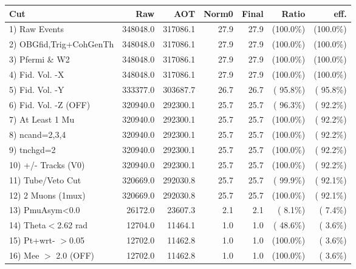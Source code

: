  \begin{table}[h!]\centering
 \begin{tabular}{||l||r|r|r|r|r|r||}
 \hline
 \hline
 Cut & Raw & AOT & Norm0 & Final & Ratio & eff.       \\
 \hline
  1) Raw Events           &     348048.0 &     317086.1 &         27.9 &         27.9 & (100.0\%) & (100.0\%) \\
  2) OBGfid,Trig+CohGenTh &     348048.0 &     317086.1 &         27.9 &         27.9 & (100.0\%) & (100.0\%) \\
  3) Pfermi \& W2         &     348048.0 &     317086.1 &         27.9 &         27.9 & (100.0\%) & (100.0\%) \\
  4) Fid. Vol. -X         &     348048.0 &     317086.1 &         27.9 &         27.9 & (100.0\%) & (100.0\%) \\
  5) Fid. Vol. -Y         &     333377.0 &     303687.7 &         26.7 &         26.7 & ( 95.8\%) & ( 95.8\%) \\
  6) Fid. Vol. -Z (OFF)   &     320940.0 &     292300.1 &         25.7 &         25.7 & ( 96.3\%) & ( 92.2\%) \\
  7) At Least 1 Mu        &     320940.0 &     292300.1 &         25.7 &         25.7 & (100.0\%) & ( 92.2\%) \\
  8) ncand=2,3,4          &     320940.0 &     292300.1 &         25.7 &         25.7 & (100.0\%) & ( 92.2\%) \\
  9) tnchgd=2             &     320940.0 &     292300.1 &         25.7 &         25.7 & (100.0\%) & ( 92.2\%) \\
 10) +/- Tracks (V0)      &     320940.0 &     292300.1 &         25.7 &         25.7 & (100.0\%) & ( 92.2\%) \\
 11) Tube/Veto Cut        &     320669.0 &     292030.8 &         25.7 &         25.7 & ( 99.9\%) & ( 92.1\%) \\
 12) 2 Muons (1mux)       &     320669.0 &     292030.8 &         25.7 &         25.7 & (100.0\%) & ( 92.1\%) \\
 13) PmuAsym<0.0          &      26172.0 &      23607.3 &          2.1 &          2.1 & (  8.1\%) & (  7.4\%) \\
 14) Theta$<$2.62 rad     &      12704.0 &      11464.1 &          1.0 &          1.0 & ( 48.6\%) & (  3.6\%) \\
 15) Pt+wrt- $>$0.05      &      12702.0 &      11462.8 &          1.0 &          1.0 & (100.0\%) & (  3.6\%) \\
 16) Mee $>$ 2.0  (OFF)   &      12702.0 &      11462.8 &          1.0 &          1.0 & (100.0\%) & (  3.6\%) \\

\end{tabular}
\end{table}
